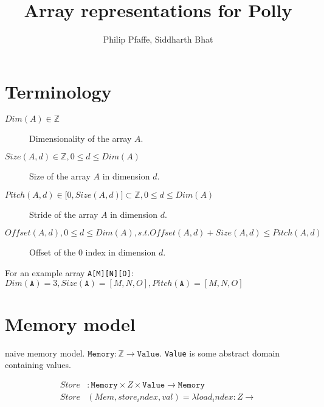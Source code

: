 \documentclass{article}
\title{Array representations for Polly}
\author{Philip Pfaffe, Siddharth Bhat}
\begin{document}
\maketitle

\newpage
\tableofcontents
\newpage

\section{Terminology}
\begin{description}
\item[$Dim(A) \in \mathbb{Z}$] Dimensionality of the array $A$.
\item[$Size(A, d) \in \mathbb{Z}, 0 \leq d \leq Dim(A)$] Size of the array $A$ in dimension $d$.
\item[$Pitch(A, d)  \in \lbrack 0,Size(A, d) \rbrack \subset \mathbb{Z}, 0\leq d \leq Dim(A) $] Stride of the array $A$ in dimension $d$.  
\item[$Offset(A, d), 0\leq d \leq Dim(A), s.t. Offset(A, d) + Size(A, d) \leq Pitch(A, d)$] Offset of the 0 index in dimension $d$.
\end{description}

For an example array \texttt{A[M][N][O]}: $Dim(\mathtt{A}) = 3, Size(\mathtt{A}) = [M,N,O], Pitch(\mathtt{A}) = [M,N,O]$

\section{Memory model}
naive memory model. $\texttt{Memory}: \mathbb{Z} \rightarrow \texttt{Value}$. \texttt{Value} is some abstract domain containing values.


\begin{align*}
Store &: \texttt{Memory} \times Z \times \texttt{Value} \rightarrow \texttt{Memory} \\
Store &(Mem, store_index, val)  = \lambda load_index : Z \rightarrow  
\end{align*}
\end{document}
